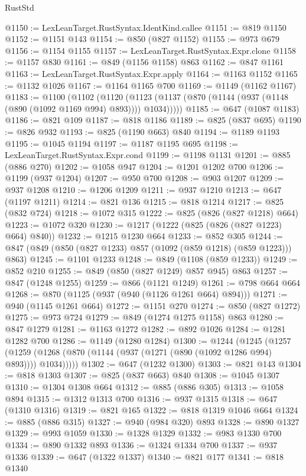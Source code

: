 \begin{lexlean}{RustStd}
\begin{coremodule}
@1150 := LexLeanTarget.RustSyntax.IdentKind.callee
@1151 := @819 @1150
@1152 := @1151 @143
@1154 := @850 (@827 @1152)
@1155 := @973 @679
@1156 := @1154 @1155
@1157 := LexLeanTarget.RustSyntax.Expr.clone
@1158 := @1157 @830
@1161 := @849 (@1156 @1158) @863
@1162 := @847 @1161
@1163 := LexLeanTarget.RustSyntax.Expr.apply
@1164 := @1163 @1152
@1165 := @1132 @1026
@1167 := @1164 @1165 @700
@1169 := @1149 (@1162 @1167)
@1183 := @1100
    (@1102
      (@1120 (@1123 (@1137 (@870 (@1144 (@937 (@1148 (@890 (@1092 @1169 @994) @893)))) @1034)))))
@1185 := @647 (@1087 @1183)
@1186 := @821 @109
@1187 := @818 @1186
@1189 := @825 (@837 @695)
@1190 := @826 @932
@1193 := @825 (@1190 @663) @840
@1194 := @1189 @1193
@1195 := @1045 @1194
@1197 := @1187 @1195 @695
@1198 := LexLeanTarget.RustSyntax.Expr.cond
@1199 := @1198 @1131
@1201 := @885 (@886 @270)
@1202 := @1058 @947
@1204 := @1201 @1202 @700
@1206 := @1199 (@937 @1204)
@1207 := @950 @700
@1208 := @903 @1207
@1209 := @937 @1208
@1210 := @1206 @1209
@1211 := @937 @1210
@1213 := @647 (@1197 @1211)
@1214 := @821 @136
@1215 := @818 @1214
@1217 := @825 (@832 @724)
@1218 := @1072 @315
@1222 := @825 (@826 (@827 @1218) @664)
@1223 := @1072 @320
@1230 := @1217 (@1222 (@825 (@826 (@827 @1223) @664) @840))
@1232 := @1215 @1230 @664
@1233 := @852 @305
@1244 := @847 (@849 (@850 (@827 @1233) @857 (@1092 (@859 @1218) (@859 @1223))) @863)
@1245 := @1101 @1233
@1248 := @849 (@1108 (@859 @1233))
@1249 := @852 @210
@1255 := @849 (@850 (@827 @1249) @857 @945) @863
@1257 := @847 (@1248 @1255)
@1259 := @866 (@1121 @1249)
@1261 := @798 @664 @664
@1268 := @870 (@1125 (@937 (@940 (@1126 @1261 @664) @894)))
@1271 := @940 (@1145 @1261 @664)
@1272 := @1151 @270
@1274 := @850 (@827 @1272)
@1275 := @973 @724
@1279 := @849 (@1274 @1275 @1158) @863
@1280 := @847 @1279
@1281 := @1163 @1272
@1282 := @892 @1026
@1284 := @1281 @1282 @700
@1286 := @1149 (@1280 @1284)
@1300 := @1244
    (@1245
      (@1257 (@1259 (@1268 (@870 (@1144 (@937 (@1271 (@890 (@1092 @1286 @994) @893)))) @1034)))))
@1302 := @647 (@1232 @1300)
@1303 := @821 @143
@1304 := @818 @1303
@1307 := @825 (@837 @663) @840
@1308 := @1045 @1307
@1310 := @1304 @1308 @664
@1312 := @885 (@886 @305)
@1313 := @1058 @894
@1315 := @1312 @1313 @700
@1316 := @937 @1315
@1318 := @647 (@1310 @1316)
@1319 := @821 @165
@1322 := @818 @1319 @1046 @664
@1324 := @885 (@886 @315)
@1327 := @940 (@984 @320) @893
@1328 := @890 @1327
@1329 := @993 @1059
@1330 := @1328 @1329
@1332 := @983 @1330 @700
@1334 := @890 @1332 @893
@1336 := @1324 @1334 @700
@1337 := @937 @1336
@1339 := @647 (@1322 @1337)
@1340 := @821 @177
@1341 := @818 @1340

\end{coremodule}
\end{lexlean}
